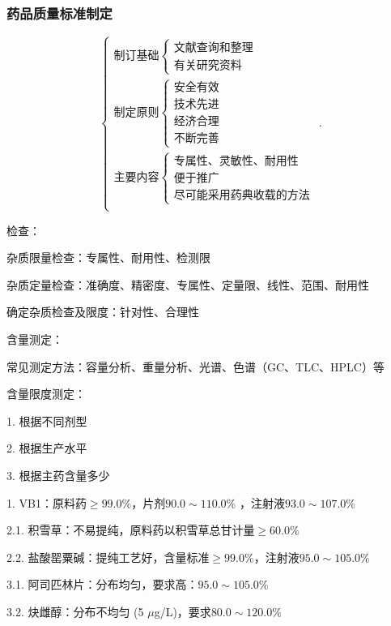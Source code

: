 \subsubsection{药品质量标准制定}%
\label{subsub:药品质量标准制定}
\[
    \begin{cases}
        \text{制订基础}\begin{cases}
            \text{文献查询和整理}\\
            \text{有关研究资料}
        \end{cases}\\
        \text{制定原则}\begin{cases}
            \text{安全有效}\\
            \text{技术先进}\\
            \text{经济合理}\\
            \text{不断完善}
        \end{cases}\\
        \text{主要内容}\begin{cases}
            \text{专属性、灵敏性、耐用性}\\
            \text{便于推广}\\
            \text{尽可能采用药典收载的方法}
        \end{cases}\\
    \end{cases}
.\] 
\begin{notation}
    检查：

    杂质限量检查：专属性、耐用性、检测限

    杂质定量检查：准确度、精密度、专属性、定量限、线性、范围、耐用性

    确定杂质检查及限度：针对性、合理性
\end{notation}
\begin{notation}
    含量测定：

    常见测定方法：容量分析、重量分析、光谱、色谱（GC、TLC、HPLC）等
\end{notation}
\begin{notation}
    含量限度测定：

    1. 根据不同剂型

    2. 根据生产水平

    3. 根据主药含量多少
\end{notation}
\begin{eg}
    1. VB1：原料药$\ge 99.0\%$，片剂$90.0\sim 110.0\%$ ，注射液$93.0\sim 107.0\%$ 

    2.1. 积雪草：不易提纯，原料药以积雪草总甘计量$\ge 60.0\%$ 

    2.2. 盐酸罂粟碱：提纯工艺好，含量标准$\ge 99.0\%$，注射液$95.0\sim 105.0\%$

    3.1. 阿司匹林片：分布均匀，要求高：$95.0\sim 105.0\%$ 

    3.2. 炔雌醇：分布不均匀 (5 $\mu$g/L)，要求$80.0\sim 120.0\%$
\end{eg}
